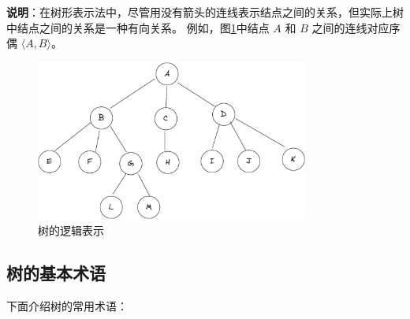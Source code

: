 \documentclass[lang=cn,newtx,10pt,scheme=chinese]{../elegantbook}
\begin{document}
\textbf{说明}：在树形表示法中，尽管用没有箭头的连线表示结点之间的关系，但实际上树中结点之间的关系是一种有向关系。
例如，图\ref{fig:tree}中结点 $A$ 和 $B$ 之间的连线对应序偶 $\langle A, B \rangle$。

\begin{figure}[!htbp]
  \centering
  \includegraphics[width=0.8\textwidth]{./figure/pdf/cropped/tree.pdf}
  \caption{树的逻辑表示}
  \label{fig:tree}
\end{figure}
\subsection{树的基本术语}
下面介绍树的常用术语：
\end{document}
